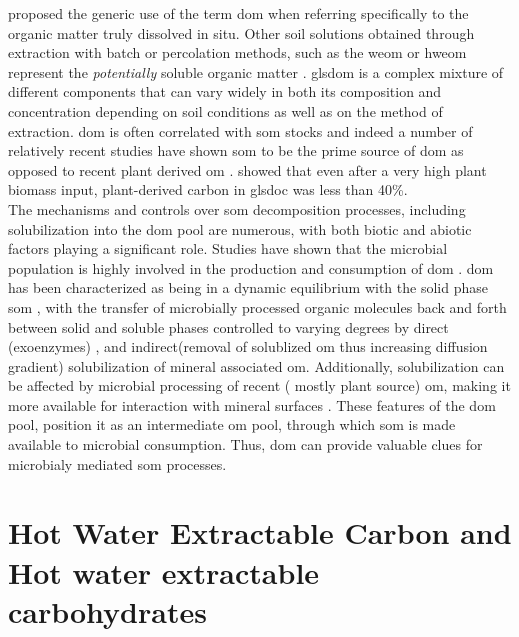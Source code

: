 	\citet{zsolnay2003} proposed the generic use of the term \gls{dom} when referring specifically to the organic matter truly dissolved in situ. Other soil solutions obtained through extraction with batch or percolation methods, such as the \gls{weom} or \gls{hweom} represent the \textit{potentially} soluble organic matter \citep{marschner2003}. gls{dom} is a complex mixture of different components that can vary widely in both its composition and concentration depending on soil conditions  as well as on the method of extraction\citep{bolan2011}. \gls{dom} is often  correlated with \gls{som} stocks and indeed a number of relatively recent studies have shown \gls{som} to be the prime source of \gls{dom} as opposed to  recent plant derived \gls{om} \citep{malik2013, kaiser2012}. \citet{malik2013}showed that  even after a very high plant biomass input, plant-derived carbon in gls{doc} was less than 40\%.\\
	The mechanisms and controls over \gls{som} decomposition processes, including solubilization  into the \gls{dom} pool are numerous, with both biotic and abiotic factors playing a significant role\citep{kalbitz2000, bolan2011}. Studies have shown that the microbial population is highly involved in the production and consumption of \gls{dom} \citep{marschnerp2002, malik2013, guggenberger1998}.  \gls{dom} has been characterized as being in a dynamic equilibrium with the solid phase \gls{som} \citep{roth2019, kaiser2012},  with the transfer of microbially processed organic molecules back and forth between solid and soluble phases controlled to varying degrees by  direct (exoenzymes) \citep{guggenberger1998},  and indirect(removal of solublized \gls{om} thus increasing diffusion gradient) solubilization of mineral associated \gls{om}. Additionally, solubilization can be affected by microbial processing of recent ( mostly plant source) \gls{om}, making it more available for interaction with mineral surfaces \citep{kalbitz2003, kalbitz2008}. These features of the \gls{dom} pool, position it as an intermediate \gls{om} pool, through which \gls{som} is made available to microbial consumption. Thus, \gls{dom} can provide valuable clues for microbialy mediated \gls{som} processes. \\

\section{Hot Water Extractable Carbon and Hot water extractable carbohydrates}

